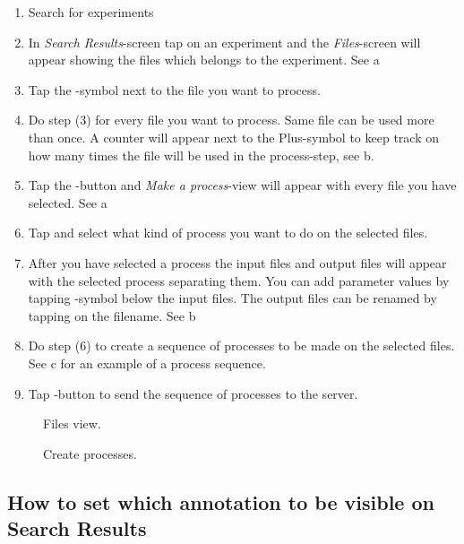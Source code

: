 \begin{enumerate}
\item Search for experiments
\item In \emph{Search Results}-screen tap on an experiment and the \emph{Files}-screen will appear showing the files which belongs to the experiment. See a
\item Tap the -symbol next to the file you want to process.
\item Do step (3) for every file you want to process. Same file can be used more than once. A counter will appear next to the Plus-symbol to keep track on how many times the file will be used in the process-step, see b.
\item Tap the -button and \emph{Make a process}-view will appear with every file you have selected. See a
\item Tap  and select what kind of process you want to do on the selected files.
\item After you have selected a process the input files and output files will appear with the selected process separating them. You can add parameter values by tapping -symbol below the input files. The output files can be renamed by tapping on the filename. See b
\item Do step (6) to create a sequence of processes to be made on the selected files. See c for an example of a process sequence.

\item Tap -button to send the sequence of processes to the server.
\end{enumerate}


\begin{figure}[htb]
\caption{Files view.}
\label{fig:ios_files_view}
\end{figure}
\FloatBarrier

\begin{figure}[htb]
\caption{Create processes.}
\label{fig:ios_make_process_view}
\end{figure}
\FloatBarrier


\subsection{How to set which annotation to be visible on Search Results}

